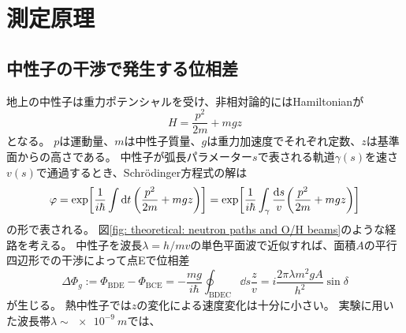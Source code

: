 \documentclass[dvipdfmx]{jsarticle}
\begin{document}
\section{測定原理}


\subsection{中性子の干渉で発生する位相差}

地上の中性子は重力ポテンシャルを受け、非相対論的にはHamiltonianが
\begin{equation*}
    H
    =
    \frac{p^2}{2m}+mgz
\end{equation*}
となる。
$p$は運動量、$m$は中性子質量、$g$は重力加速度でそれぞれ定数、$z$は基準面からの高さである。
中性子が弧長パラメーター$s$で表される軌道$\gamma(s)$を速さ$v(s)$で通過するとき、Schrödinger方程式の解は
\begin{equation*}
    \varphi
    =
    \exp[
        \frac{1}{i\hbar}\int\dd{t}
        \qty(
            \frac{p^2}{2m}+mgz
        )
    ]
    =
    \exp[
        \frac{1}{i\hbar}\int_\gamma\frac{\dd{s}}{v}
        \qty(\frac{p^2}{2m}+mgz)
    ]
\end{equation*}
の形で表される。
図\ref{fig: theoretical: neutron paths and O/H beams}のような経路を考える。
中性子を波長$\lambda=h/mv$の単色平面波で近似すれば、面積$A$の平行四辺形での干渉によって点Eで位相差
\begin{equation}
    \Delta\Phi_g
    :=
    \Phi_\mathrm{BDE}-\Phi_\mathrm{BCE}
    =
    -\frac{mg}{i\hbar}
    \oint_\mathrm{BDEC}\dd{s}\frac{z}{v}
    =
    i\frac{2\pi\lambda m^2gA}{h^2}\sin\delta
\end{equation}
が生じる。
熱中性子では$z$の変化による速度変化は十分に小さい。
実験に用いた波長帯$\lambda\sim\SI{e-9}{m}$では、
\end{document}
